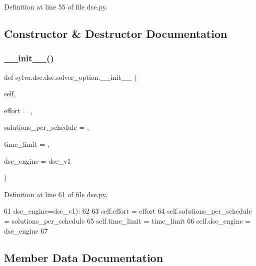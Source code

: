 Definition at line 55 of file dse.\+py.



\subsection{Constructor \& Destructor Documentation}
\mbox{\label{classsylva_1_1dse_1_1dse_1_1solver__option_a9dc8c1ee5f29aeabb4b6587974adfbec}} 
\subsubsection{\texorpdfstring{\+\_\+\+\_\+init\+\_\+\+\_\+()}{\_\_init\_\_()}}
{\footnotesize\ttfamily def sylva.\+dse.\+dse.\+solver\+\_\+option.\+\_\+\+\_\+init\+\_\+\+\_\+ (\begin{DoxyParamCaption}\item[{}]{self,  }\item[{}]{effort = {},  }\item[{}]{solutions\+\_\+per\+\_\+schedule = {},  }\item[{}]{time\+\_\+limit = {},  }\item[{}]{dse\+\_\+engine = {\ttfamily dse\+\_\+v1} }\end{DoxyParamCaption})}



Definition at line 61 of file dse.\+py.


\begin{DoxyCode}
61                  dse\_engine=dse\_v1):
62 
63         self.effort = effort
64         self.solutions\_per\_schedule = solutions\_per\_schedule
65         self.time\_limit = time\_limit
66         self.dse\_engine = dse\_engine
67 
\end{DoxyCode}


\subsection{Member Data Documentation}
\mbox{\label{classsylva_1_1dse_1_1dse_1_1solver__option_a7a53af2287a6078049559a565fbb9e90}} 
